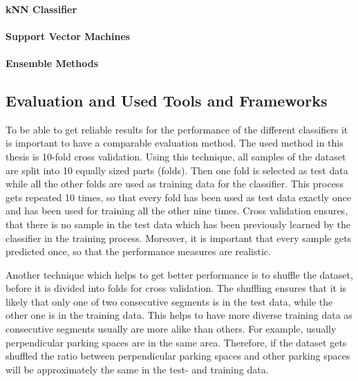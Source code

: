 \paragraph{kNN Classifier}
\paragraph{Support Vector Machines}
\paragraph{Ensemble Methods}


\subsection{Evaluation and Used Tools and Frameworks}

To be able to get reliable results for the performance of the different classifiers it is important to have a comparable evaluation method. The used method in this thesis is 10-fold cross validation. Using this technique, all samples of the dataset are split into 10 equally sized parts (folds). Then one fold is selected as test data while all the other folds are used as training data for the classifier. This process gets repeated 10 times, so that every fold has been used as test data exactly once and has been used for training all the other nine times. Cross validation ensures, that there is no sample in the test data which has been previously learned by the classifier in the training process. Moreover, it is important that every sample gets predicted once, so that the performance measures are realistic.

Another technique which helps to get better performance is to shuffle the dataset, before it is divided into folds for cross validation. The shuffling ensures that it is likely that only one of two consecutive segments is in the test data, while the other one is in the training data. This helps to have more diverse training data as consecutive segments usually are more alike than others. For example, usually perpendicular parking spaces are in the same area. Therefore, if the dataset gets shuffled the ratio between perpendicular parking spaces and other parking spaces will be approximately the same in the test- and training data.



